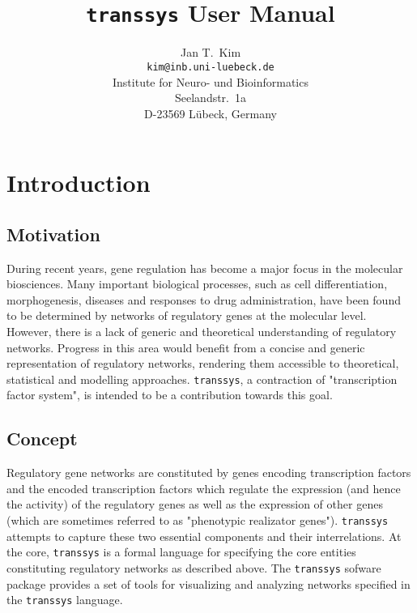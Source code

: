 \documentclass[12pt]{article}
\newcommand{\transsys}{\texttt{transsys}}
\begin{document}
\title{\transsys{} User Manual}
\author{Jan T.\ Kim \\[\bigskipamount]
  \texttt{kim@inb.uni-luebeck.de} \\[\bigskipamount]
  Institute for Neuro- und Bioinformatics \\
  Seelandstr.\ 1a \\
  D-23569 L\"{u}beck, Germany}
\maketitle

\section{Introduction}

\subsection{Motivation}

During recent years, gene regulation has become a major focus in the
molecular biosciences. Many important biological processes, such as
cell differentiation, morphogenesis, diseases and responses to drug
administration, have been found to be determined by networks of
regulatory genes at the molecular level. However, there is a lack of
generic and theoretical understanding of regulatory networks. Progress
in this area would benefit from a concise and generic representation
of regulatory networks, rendering them accessible to theoretical,
statistical and modelling approaches. \transsys{}, a contraction of
"transcription factor system", is intended to be a contribution
towards this goal.


\subsection{Concept}

Regulatory gene networks are constituted by genes encoding
transcription factors and the encoded transcription factors which
regulate the expression (and hence the activity) of the regulatory
genes as well as the expression of other genes (which are sometimes
referred to as "phenotypic realizator genes"). \transsys{} attempts to
capture these two essential components and their interrelations. At
the core, \transsys{} is a formal language for specifying the core
entities constituting regulatory networks as described above. The
\transsys{} sofware package provides a set of tools for visualizing
and analyzing networks specified in the \transsys{} language.
\end{document}
